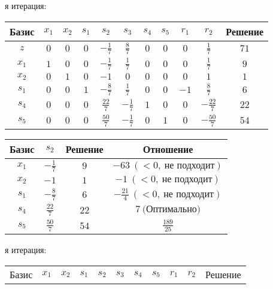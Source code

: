 \documentclass{article}%
\begin{document}
\begin{flushleft}
\newline%
я итерация: %
\newline%
\newline%
\renewcommand{\arraystretch}{1.3}%
\begin{tabular}{|c|ccccccccc|c|}%
\hline%
Базис&$x_{1}$&$x_{2}$&$s_{1}$&$s_{2}$&$s_{3}$&$s_{4}$&$s_{5}$&$r_{1}$&$r_{2}$&Решение\\%
\hline%
$z$&$0$&$0$&$0$&$-\frac{1}{7}$&$\frac{8}{7}$&$0$&$0$&$0$&$\frac{1}{7}$&$71$\\%
\hline%
$x_{1}$&$1$&$0$&$0$&$-\frac{1}{7}$&$\frac{1}{7}$&$0$&$0$&$0$&$\frac{1}{7}$&$9$\\%
$x_{2}$&$0$&$1$&$0$&$-1$&$0$&$0$&$0$&$0$&$1$&$1$\\%
$s_{1}$&$0$&$0$&$1$&$-\frac{8}{7}$&$\frac{1}{7}$&$0$&$0$&$-1$&$\frac{8}{7}$&$6$\\%
$s_{4}$&$0$&$0$&$0$&$\frac{22}{7}$&$-\frac{1}{7}$&$1$&$0$&$0$&$-\frac{22}{7}$&$22$\\%
$s_{5}$&$0$&$0$&$0$&$\frac{50}{7}$&$-\frac{1}{7}$&$0$&$1$&$0$&$-\frac{50}{7}$&$54$\\%
\hline%
\end{tabular}%
\newline%
\newline%
\newline%
\begin{tabular}{|cccc|}%
\hline%
Базис&$s_{2}$&Решение&Отношение\\%
\hline%
$x_{1}$&$-\frac{1}{7}$&$9$&$-63\: (< 0, \: \text{не подходит})$\\%
$x_{2}$&$-1$&$1$&$-1\: (< 0, \: \text{не подходит})$\\%
$s_{1}$&$-\frac{8}{7}$&$6$&$-\frac{21}{4}\: (< 0, \: \text{не подходит})$\\%
$s_{4}$&$\frac{22}{7}$&$22$&$7\: \text{(Оптимально)}$\\%
$s_{5}$&$\frac{50}{7}$&$54$&$\frac{189}{25}$\\%
\hline%
\end{tabular}%
\newline%
\newline%
я итерация: %
\newline%
\newline%
\renewcommand{\arraystretch}{1.3}%
\begin{tabular}{|c|ccccccccc|c|}%
\hline%
Базис&$x_{1}$&$x_{2}$&$s_{1}$&$s_{2}$&$s_{3}$&$s_{4}$&$s_{5}$&$r_{1}$&$r_{2}$&Решение\\%

\end{tabular}
\end{flushleft}
\end{document}
